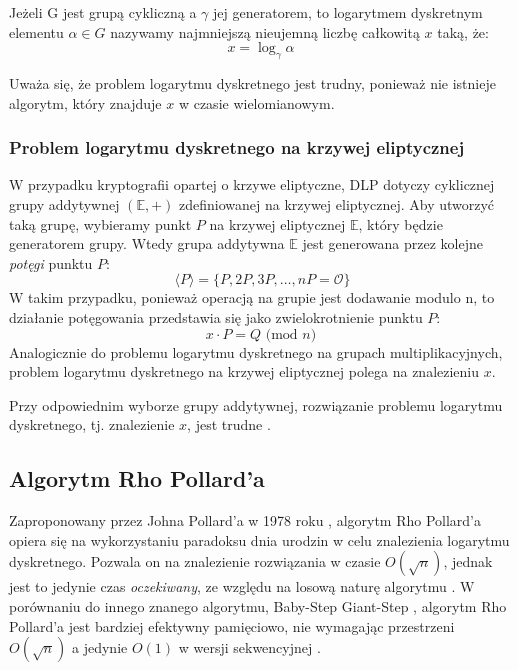Jeżeli G jest grupą cykliczną a $\gamma$ jej generatorem, to logarytmem dyskretnym
elementu $\alpha \in G$ nazywamy najmniejszą nieujemną liczbę całkowitą $x$ taką, że:
\[x = \log_{\gamma}{\alpha}\]

Uważa się, że problem logarytmu dyskretnego jest trudny, ponieważ nie istnieje
algorytm, który znajduje $x$ w czasie wielomianowym\cite{Stinson2021}.


\subsubsection{Problem logarytmu dyskretnego na krzywej eliptycznej}
W przypadku kryptografii opartej o krzywe eliptyczne, DLP dotyczy cyklicznej \\
grupy addytywnej $(\mathbb{E},+)$ zdefiniowanej na krzywej eliptycznej.
Aby utworzyć taką grupę, wybieramy punkt $P$ na krzywej eliptycznej $\mathbb{E}$,
który będzie generatorem grupy. Wtedy grupa addytywna $\mathbb{E}$ jest generowana przez
kolejne \textit{potęgi} punktu $P$:
\[\ \langle P \rangle = \{P, 2P, 3P, \ldots, nP = \mathcal{O}\}\]
W takim przypadku, ponieważ operacją na grupie jest dodawanie modulo n, to działanie
potęgowania przedstawia się jako zwielokrotnienie punktu $P$:
\[x \cdot P = Q \textrm{ (mod } n)\]
Analogicznie do problemu logarytmu dyskretnego na grupach multiplikacyjnych,
problem logarytmu dyskretnego na krzywej eliptycznej polega na znalezieniu
$x$.
\par
Przy odpowiednim wyborze grupy addytywnej, rozwiązanie problemu logarytmu dyskretnego,
tj. znalezienie $x$,
jest trudne \cite{Stinson2021}.


\subsection{Algorytm Rho Pollard'a}

Zaproponowany przez Johna Pollard'a w 1978 roku \cite{Pollard1978},
algorytm Rho Pollard'a opiera się na wykorzystaniu paradoksu dnia urodzin w celu znalezienia logarytmu dyskretnego.
Pozwala on na znalezienie rozwiązania w czasie $O(\sqrt{n})$,
jednak jest to jedynie czas \textit{oczekiwany}, ze względu na losową naturę algorytmu \cite{Blake2005}.
W porównaniu do innego znanego algorytmu, Baby-Step Giant-Step \cite{Stinson2021}, algorytm Rho Pollard'a jest bardziej
efektywny pamięciowo, nie wymagając
przestrzeni $O(\sqrt{n})$ a jedynie $O(1)$ w wersji sekwencyjnej \cite{Stinson2021}\cite{Blake2005}.
\par

